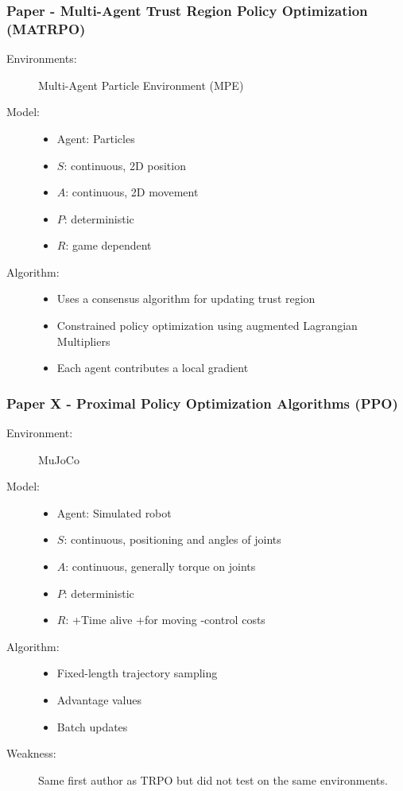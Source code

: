 \documentclass{beamer}
\begin{document}
\begin{frame} %
    \frametitle{Paper \thepapercounter - Multi-Agent Trust Region Policy Optimization (MATRPO)%
    }
    \begin{description} 
        \item[Environments:] Multi-Agent Particle Environment (MPE)
        \item[Model:]
        \begin{itemize}
            \item Agent: Particles
            \item $S$: continuous, 2D position
            \item $A$: continuous, 2D movement
            \item $P$: deterministic
            \item $R$: game dependent
        \end{itemize}
        \item[Algorithm:]
        \begin{itemize}
            \item Uses a consensus algorithm for updating trust region
            \item Constrained policy optimization using augmented Lagrangian Multipliers
            \item Each agent contributes a local gradient
        \end{itemize}
    \end{description}
\end{frame}

\begin{frame} %
    \frametitle{Paper X - Proximal Policy Optimization Algorithms (PPO)%
    }
    \begin{description}
        \item[Environment:] MuJoCo 
        \item[Model:]
        \begin{itemize}
            \item Agent: Simulated robot
            \item $S$: continuous, positioning and angles of joints
            \item $A$: continuous, generally torque on joints
            \item $P$: deterministic
            \item $R$: +Time alive +for moving -control costs
        \end{itemize}
        \item[Algorithm:] 
        \begin{itemize}
            \item Fixed-length trajectory sampling
            \item Advantage values
            \item Batch updates
        \end{itemize}
        \item[Weakness:] Same first author as TRPO but did not test on the same environments.
    \end{description}
\end{frame}
\end{document}
